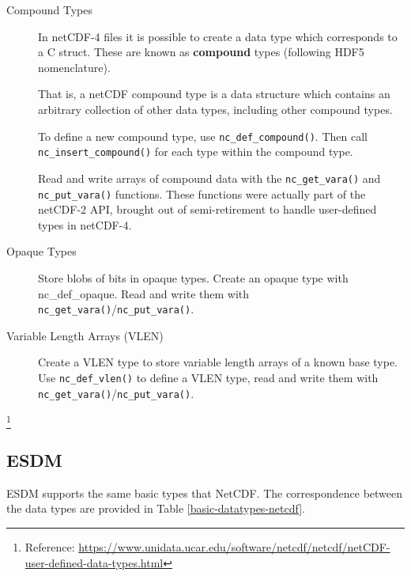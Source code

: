 \begin{description}

\item[Compound Types]

In netCDF-4 files it is possible to create a data type which corresponds to a C struct. These are known as \textbf{compound} types (following HDF5 nomenclature).

That is, a netCDF compound type is a data structure which contains an arbitrary collection of other data types, including other compound types.

To define a new compound type, use \texttt{nc\_def\_compound()}. Then call \texttt{nc\_insert\_compound()} for each type within the compound type.

Read and write arrays of compound data with the \texttt{nc\_get\_vara()} and \texttt{nc\_put\_vara()} functions. These functions were actually part of the netCDF-2 API, brought out of semi-retirement to handle user-defined types in netCDF-4.

\item[Opaque Types]

Store blobs of bits in opaque types. Create an opaque type with nc\_def\_opaque. Read and write them with \texttt{nc\_get\_vara()}/\texttt{nc\_put\_vara()}.

\item[Variable Length Arrays (VLEN)]

Create a VLEN type to store variable length arrays of a known base type. Use \texttt{nc\_def\_vlen()} to define a VLEN type, read and write them with \texttt{nc\_get\_vara()}/\texttt{nc\_put\_vara()}.

\end{description}

\footnote{Reference: \url{https://www.unidata.ucar.edu/software/netcdf/netcdf/netCDF-user-defined-data-types.html}}

\subsection{ESDM}

\tab
ESDM supports the same basic types that NetCDF. The correspondence between the data types are provided in Table \ref{basic-datatypes-netcdf}.


